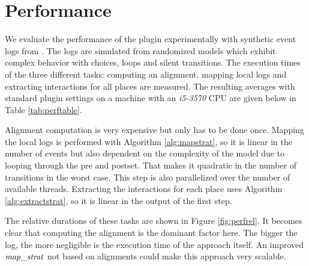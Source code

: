 \section{Performance} \label{sec:performance}
We evaluate the performance of the plugin experimentally with synthetic event logs from \cite{scalelogs}.
The logs are simulated from randomized models which exhibit complex behavior with choices, loops and silent transitions.
The execution times of the three different tasks: computing an alignment, mapping local logs and extracting interactions for all places are measured.
The resulting averages with standard plugin settings on a machine with an \emph{i5-3570} CPU are given below in Table \ref{tab:perftable}.
\begin{table}[H]
    \centering
    \caption{Performance on different log sizes}
    \label{tab:perftable}
\end{table}
Alignment computation is very expensive but only has to be done once. Mapping the local logs is performed with Algorithm \ref{alg:mapstrat}, so it is linear in the number of events but also dependent on the complexity of the model due to looping through the pre and postset. That makes it quadratic in the number of transitions in the worst case. This step is also parallelized over the number of available threads. Extracting the interactions for each place uses Algorithm \ref{alg:extractstrat}, so it is linear in the output of the first step.

The relative durations of these tasks are shown in Figure \ref{fig:perfrel}. It becomes clear that computing the alignment is the dominant factor here. The bigger the log, the more negligible is the execution time of the approach itself. An improved $\mathit{map\_strat}$ not based on alignments could make this approach very scalable.

